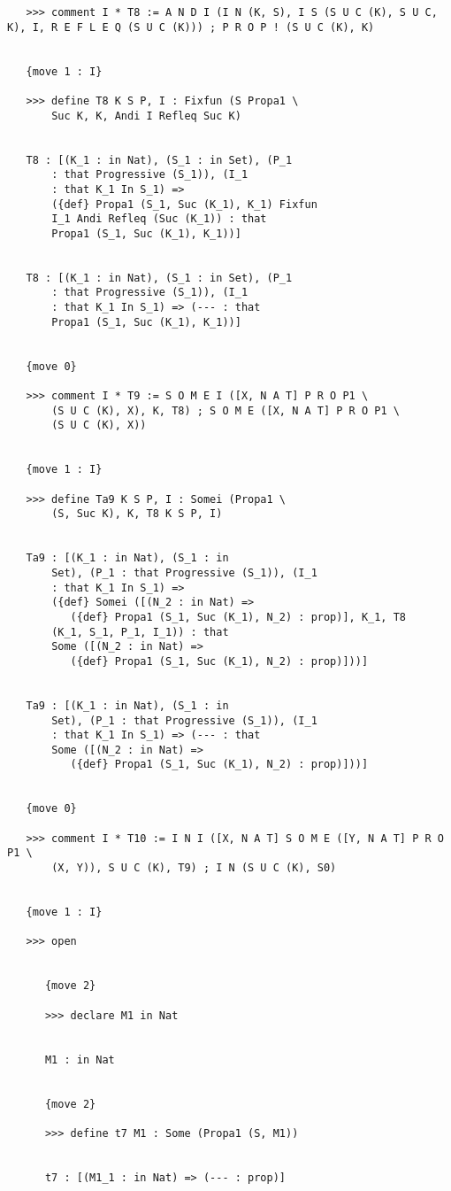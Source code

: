 \documentclass{article}
\begin{document}
\begin{verbatim}
   >>> comment I * T8 := A N D I (I N (K, S), I S (S U C (K), S U C, K), I, R E F L E Q (S U C (K))) ; P R O P ! (S U C (K), K)


   {move 1 : I}

   >>> define T8 K S P, I : Fixfun (S Propa1 \
       Suc K, K, Andi I Refleq Suc K)


   T8 : [(K_1 : in Nat), (S_1 : in Set), (P_1 
       : that Progressive (S_1)), (I_1 
       : that K_1 In S_1) => 
       ({def} Propa1 (S_1, Suc (K_1), K_1) Fixfun 
       I_1 Andi Refleq (Suc (K_1)) : that 
       Propa1 (S_1, Suc (K_1), K_1))]


   T8 : [(K_1 : in Nat), (S_1 : in Set), (P_1 
       : that Progressive (S_1)), (I_1 
       : that K_1 In S_1) => (--- : that 
       Propa1 (S_1, Suc (K_1), K_1))]


   {move 0}

   >>> comment I * T9 := S O M E I ([X, N A T] P R O P1 \
       (S U C (K), X), K, T8) ; S O M E ([X, N A T] P R O P1 \
       (S U C (K), X))


   {move 1 : I}

   >>> define Ta9 K S P, I : Somei (Propa1 \
       (S, Suc K), K, T8 K S P, I)


   Ta9 : [(K_1 : in Nat), (S_1 : in 
       Set), (P_1 : that Progressive (S_1)), (I_1 
       : that K_1 In S_1) => 
       ({def} Somei ([(N_2 : in Nat) => 
          ({def} Propa1 (S_1, Suc (K_1), N_2) : prop)], K_1, T8 
       (K_1, S_1, P_1, I_1)) : that 
       Some ([(N_2 : in Nat) => 
          ({def} Propa1 (S_1, Suc (K_1), N_2) : prop)]))]


   Ta9 : [(K_1 : in Nat), (S_1 : in 
       Set), (P_1 : that Progressive (S_1)), (I_1 
       : that K_1 In S_1) => (--- : that 
       Some ([(N_2 : in Nat) => 
          ({def} Propa1 (S_1, Suc (K_1), N_2) : prop)]))]


   {move 0}

   >>> comment I * T10 := I N I ([X, N A T] S O M E ([Y, N A T] P R O P1 \
       (X, Y)), S U C (K), T9) ; I N (S U C (K), S0)


   {move 1 : I}

   >>> open


      {move 2}

      >>> declare M1 in Nat


      M1 : in Nat


      {move 2}

      >>> define t7 M1 : Some (Propa1 (S, M1))


      t7 : [(M1_1 : in Nat) => (--- : prop)]



\end{verbatim}
\end{document}
